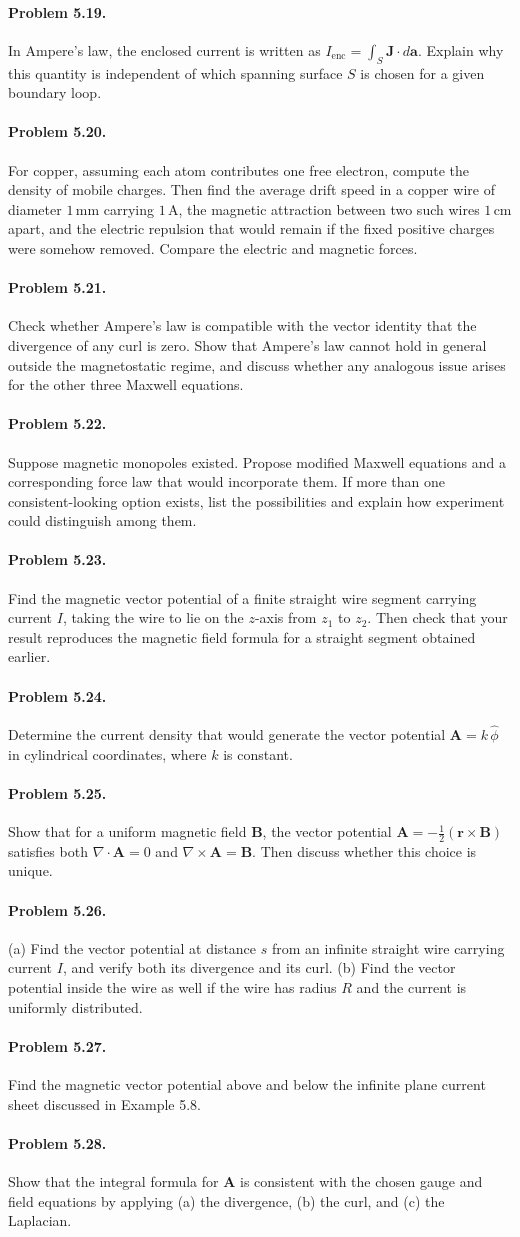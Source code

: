 \documentclass{aa}
\newcommand{\problemstatement}[2]{%
\paragraph{Problem #1.}#2\par\medskip
}
\begin{document}
\problemstatement{5.19}{In Ampere's law, the enclosed current is written as \(I_{\mathrm{enc}}=\int_S \mathbf J\cdot d\mathbf a\). Explain why this quantity is independent of which spanning surface \(S\) is chosen for a given boundary loop.}
\problemstatement{5.20}{For copper, assuming each atom contributes one free electron, compute the density of mobile charges. Then find the average drift speed in a copper wire of diameter \(1\,\mathrm{mm}\) carrying \(1\,\mathrm{A}\), the magnetic attraction between two such wires \(1\,\mathrm{cm}\) apart, and the electric repulsion that would remain if the fixed positive charges were somehow removed. Compare the electric and magnetic forces.}
\problemstatement{5.21}{Check whether Ampere's law is compatible with the vector identity that the divergence of any curl is zero. Show that Ampere's law cannot hold in general outside the magnetostatic regime, and discuss whether any analogous issue arises for the other three Maxwell equations.}
\problemstatement{5.22}{Suppose magnetic monopoles existed. Propose modified Maxwell equations and a corresponding force law that would incorporate them. If more than one consistent-looking option exists, list the possibilities and explain how experiment could distinguish among them.}
\problemstatement{5.23}{Find the magnetic vector potential of a finite straight wire segment carrying current \(I\), taking the wire to lie on the \(z\)-axis from \(z_1\) to \(z_2\). Then check that your result reproduces the magnetic field formula for a straight segment obtained earlier.}
\problemstatement{5.24}{Determine the current density that would generate the vector potential \(\mathbf A = k\,\hat{\phi}\) in cylindrical coordinates, where \(k\) is constant.}
\problemstatement{5.25}{Show that for a uniform magnetic field \(\mathbf B\), the vector potential \(\mathbf A = -\frac12(\mathbf r\times \mathbf B)\) satisfies both \(\nabla\cdot\mathbf A=0\) and \(\nabla\times\mathbf A=\mathbf B\). Then discuss whether this choice is unique.}
\problemstatement{5.26}{(a) Find the vector potential at distance \(s\) from an infinite straight wire carrying current \(I\), and verify both its divergence and its curl. (b) Find the vector potential inside the wire as well if the wire has radius \(R\) and the current is uniformly distributed.}
\problemstatement{5.27}{Find the magnetic vector potential above and below the infinite plane current sheet discussed in Example 5.8.}
\problemstatement{5.28}{Show that the integral formula for \(\mathbf A\) is consistent with the chosen gauge and field equations by applying (a) the divergence, (b) the curl, and (c) the Laplacian.}
\end{document}
